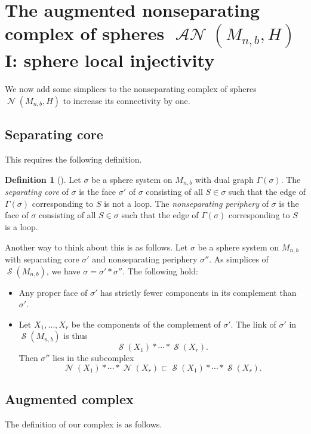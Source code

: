 \documentclass[11pt]{amsart}
\numberwithin{equation}{section}
\theoremstyle{plain}
\theoremstyle{definition}
\newtheorem{defn}[theorem]{Definition}
\newenvironment{definition}[1][]{\begin{defn}[#1]\pushQED{\qed}}{\popQED \end{defn}}
\theoremstyle{remark}
\DeclareMathOperator{\Spheres}{\mathcal{S}}
\DeclareMathOperator{\NSpheres}{\mathcal{N}}
\DeclareMathOperator{\ANSpheres}{\mathcal{AN}}
\begin{document}
\section{The augmented nonseparating complex of spheres \texorpdfstring{$\ANSpheres(M_{n,b},H)$}{AN(M,H)} I: sphere local injectivity}
\label{section:augmentedsphere}

We now add some simplices to the nonseparating complex of spheres $\NSpheres(M_{n,b},H)$ to increase its connectivity
by one.

\subsection{Separating core}
This requires the following definition.

\begin{definition}
Let $\sigma$ be a sphere system on $M_{n,b}$ with dual graph $\Gamma(\sigma)$.  The
{\em separating core} of $\sigma$ is the face $\sigma'$ of $\sigma$ consisting of all
$S \in \sigma$ such that the edge of $\Gamma(\sigma)$ corresponding to $S$ is not a loop.
The {\em nonseparating periphery} of $\sigma$ is the face of $\sigma$ consisting of all
$S \in \sigma$ such that the edge of $\Gamma(\sigma)$ corresponding to $S$ is a loop. 
\end{definition}

Another way to think about this is as follows.  Let $\sigma$ be a sphere system on $M_{n,b}$
with separating core $\sigma'$ and nonseparating periphery $\sigma''$.  As simplices
of $\Spheres(M_{n,b})$, we have $\sigma = \sigma' \ast \sigma''$.  The following hold:
\begin{itemize}
\item Any proper face of $\sigma'$ has strictly fewer components in its complement than
$\sigma'$.
\item Let $X_1,\ldots,X_r$ be the components of the complement of $\sigma'$.  The link
of $\sigma'$ in $\Spheres(M_{n,b})$ is thus
\[\Spheres(X_1) \ast \cdots \ast \Spheres(X_r).\]
Then $\sigma''$ lies in the subcomplex
\[\NSpheres(X_1) \ast \cdots \ast \NSpheres(X_r) \subset \Spheres(X_1) \ast \cdots \ast \Spheres(X_r).\]
\end{itemize}

\subsection{Augmented complex}
The definition of our complex is as follows.
\end{document}
